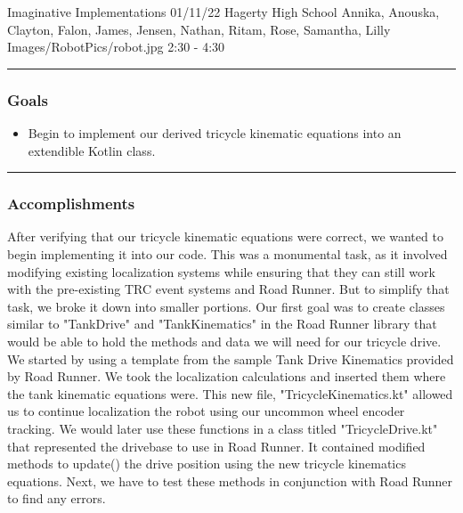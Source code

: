 \insertmeeting 
	{Imaginative Implementations} 
	{01/11/22} 
	{Hagerty High School}
	{Annika, Anouska, Clayton, Falon, James, Jensen, Nathan, Ritam, Rose, Samantha, Lilly}
	{Images/RobotPics/robot.jpg}
	{2:30 - 4:30}
	
\noindent\hfil\rule{\textwidth}{.4pt}\hfil
\subsubsection*{Goals}
\begin{itemize}
    \item Begin to implement our derived tricycle kinematic equations into an extendible Kotlin class.   

\end{itemize} 

\noindent\hfil\rule{\textwidth}{.4pt}\hfil

\subsubsection*{Accomplishments}
After verifying that our tricycle kinematic equations were correct, we wanted to begin implementing it into our code. This was a monumental task, as it involved modifying existing localization systems while ensuring that they can still work with the pre-existing TRC event systems and Road Runner. But to simplify that task, we broke it down into smaller portions. Our first goal was to create classes similar to "TankDrive" and "TankKinematics" in the Road Runner library that would be able to hold the methods and data we will need for our tricycle drive. We started by using a template from the sample Tank Drive Kinematics provided by Road Runner. We took the localization calculations and inserted them where the tank kinematic equations were. This new file, "TricycleKinematics.kt" allowed us to continue localization the robot using our uncommon wheel encoder tracking. We would later use these functions in a class titled "TricycleDrive.kt" that represented the drivebase to use in Road Runner. It contained modified methods to update() the drive position using the new tricycle kinematics equations. Next, we have to test these methods in conjunction with Road Runner to find any errors. 
 

